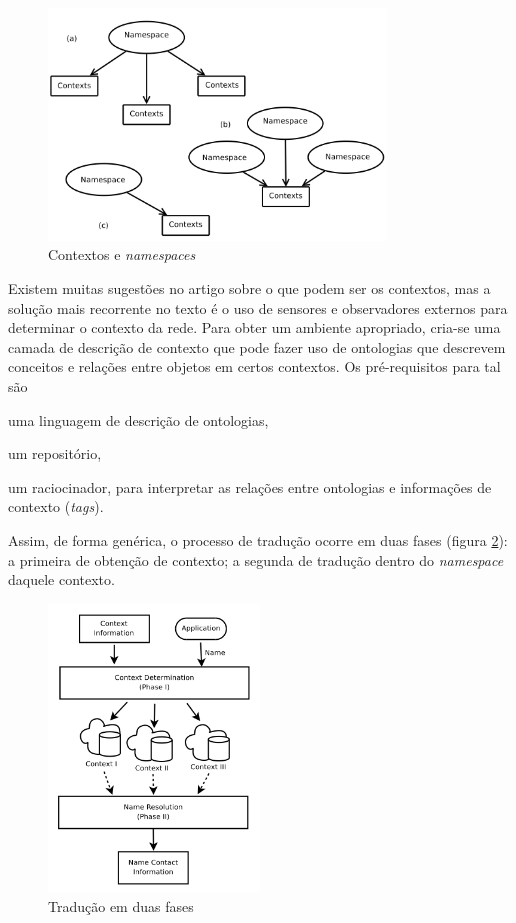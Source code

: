     \begin{figure}[h!]
        \centering
        \includegraphics[width=0.8\textwidth]{figures/contexts}
        \caption{Contextos e \textit{namespaces}}
        \label{namespaces}
    \end{figure}
    
    Existem muitas sugestões no artigo sobre o que podem ser os contextos, mas a
    solução mais recorrente no texto é o uso de sensores e observadores externos
    para determinar o contexto da rede. Para obter um ambiente apropriado, cria-se
    uma camada de descrição de contexto que pode fazer uso de ontologias que
    descrevem conceitos e relações entre objetos em certos contextos. Os pré-requisitos
    para tal são
    \begin{inparaenum}[(i)]
        \item uma linguagem de descrição de ontologias,
        \item um repositório,
        \item um raciocinador, para interpretar as relações entre ontologias e
        informações de contexto (\textit{tags}).
    \end{inparaenum} 
    Assim, de forma genérica, o processo de tradução ocorre em duas fases
    (figura \ref{translation}): a primeira de obtenção de contexto; a segunda
    de tradução dentro do \textit{namespace} daquele contexto.
    
    \begin{figure}[h!]
        \centering
        \includegraphics[width=0.5\textwidth]{figures/translation}
        \caption{Tradução em duas fases}
        \label{translation}
    \end{figure}
    
